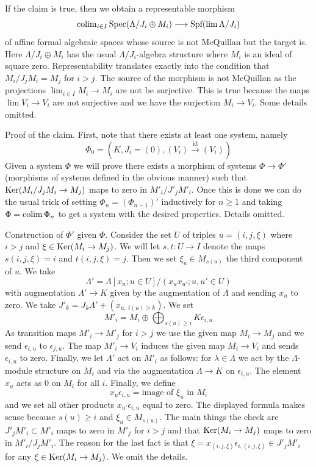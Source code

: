 \medskip\noindent
If the claim is true, then we obtain a representable morphism
$$
\mathop{\mathrm{colim}}\nolimits_{i \in I} \mathop{\mathrm{Spec}}(\Lambda/J_i \oplus M_i)
\longrightarrow
\text{Spf}(\mathop{\mathrm{lim}}\nolimits \Lambda/J_i)
$$
of affine formal algebraic spaces whose source is not McQuillan
but the target is. Here $\Lambda/J_i \oplus M_i$ has the usual
$\Lambda/J_i$-algebra structure where $M_i$ is an ideal of square zero.
Representability translates exactly into the
condition that $M_i/J_jM_i = M_j$ for $i > j$. The source
of the morphism is not McQuillan as the projections
$\lim_{i \in I} M_i \to M_i$ are not be surjective. This is true
because the maps $\lim V_i \to V_i$ are not surjective
and we have the surjection $M_i \to V_i$. Some details omitted.

\medskip\noindent
Proof of the claim. First, note that there exists at least one
system, namely
$$
\Phi_0 = (K, J_i = (0), (V_i) \xrightarrow{\text{id}} (V_i))
$$
Given a system $\Phi$ we will prove there exists a morphism of systems
$\Phi \to \Phi'$ (morphisms of systems defined in the obvious manner)
such that $\mathop{\mathrm{Ker}}(M_i/J_j M_i \to M_j)$ maps to zero in
$M'_i/J'_j M'_i$. Once this is done we can do the usual trick
of setting $\Phi_n = (\Phi_{n - 1})'$ inductively for $n \geq 1$ and
taking $\Phi = \mathop{\mathrm{colim}}\nolimits \Phi_n$ to get a system with the desired properties.
Details omitted.

\medskip\noindent
Construction of $\Phi'$ given $\Phi$. Consider the set $U$ of
triples $u = (i, j, \xi)$ where $i > j$ and $\xi \in \mathop{\mathrm{Ker}}(M_i \to M_j)$.
We will let $s, t : U \to I$ denote the maps $s(i, j, \xi) = i$
and $t(i, j, \xi) = j$. Then we set $\xi_u \in M_{s(u)}$ the third
component of $u$. We take
$$
\Lambda' = \Lambda[x_u; u \in U]/(x_u x_{u'}; u, u' \in U)
$$
with augmentation $\Lambda' \to K$ given by the augmentation of $\Lambda$
and sending $x_u$ to zero.
We take $J'_k = J_k \Lambda' + (x_{u,\ t(u) \geq k})$.
We set
$$
M'_i = M_i \oplus \bigoplus\nolimits_{s(u) \geq i} K\epsilon_{i, u}
$$
As transition maps $M'_i \to M'_j$ for $i > j$ we use
the given map $M_i \to M_j$ and we send $\epsilon_{i, u}$ to
$\epsilon_{j, u}$. The map $M'_i \to V_i$ induces the given map
$M_i \to V_i$ and sends $\epsilon_{i, u}$ to zero.
Finally, we let $\Lambda'$ act on $M'_i$ as follows:
for $\lambda \in \Lambda$ we act by the $\Lambda$-module
structure on $M_i$ and via the augmentation $\Lambda \to K$
on $\epsilon_{i, u}$. The element $x_u$ acts as $0$ on $M_i$
for all $i$. Finally, we define
$$
x_u \epsilon_{i, u} = \text{image of }\xi_u\text{ in }M_i
$$
and we set all other products $x_{u'} \epsilon_{i, u}$ equal to zero.
The displayed formula makes sense because $s(u) \geq i$ and
$\xi_u \in M_{s(u)}$. The main things the check are $J'_j M'_i \subset M'_i$
maps to zero in $M'_j$ for $i > j$ and that $\mathop{\mathrm{Ker}}(M_i \to M_j)$
maps to zero in $M'_i/J_j M'_i$. The reason for the last fact
is that $\xi = x_{(i, j, \xi)} \epsilon_{i, (i, j, \xi)} \in J'_j M'_i$
for any $\xi \in \mathop{\mathrm{Ker}}(M_i \to M_j)$.
We omit the details.

